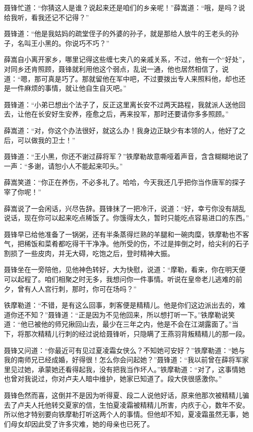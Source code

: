 \documentclass[12pt,oneside]{book}
\begin{document}
聂锋忙道：``你猜这人是谁？说起来还是咱们的乡亲呢！''薛嵩道：``哦，是吗？说给我听，看我还记不记得？''

聂锋道：``他是我姑妈的疏堂侄子的外婆的孙子，就是那给人放牛的王老头的孙子，名叫王小黑的。你说巧不巧？''

薛嵩自小离开家乡，哪里记得这些缠七夹八的亲戚关系，不过，他有一个``好处''，对同乡还肯照顾，聂锋就利用他这个弱点，乱说一通，他也居然相信了，说道：``嗯，那可真是巧了。那就留他在军中吧，不过要拨出专人来照料他，却也还是一件麻烦的事情，就让他自生自灭吧。''

聂锋道：``小弟已想出个法子了，反正这里离长安不过两天路程，我就派人送他回去，让他在长安好生安养，痊愈之后，再来投军，那时还要请你多多照顾。''

薛嵩道：``对，你这个办法很好，就这么办！我身边正缺少有本领的人，他好了之后，可以做我的卫士！''

聂锋道：``王小黑，你还不谢过薛将军？''铁摩勒故意嘶哑着声音，含含糊糊地说了一声：``多谢，请恕小人不能起来叩头。''

薛嵩笑道：``你正在养伤，不必多礼了。哈哈，今天我还几乎把你当作唐军的探子宰了你呢！''

薛嵩说了一会闲话，兴尽告辞。聂锋抹了一把冷汗，说道：``好，幸亏你没有胡乱说话，现在你可以起来吃点稀饭了。你饿得太久，暂时只能吃点容易进口的东西。''

聂锋早已给他准备了一锅粥，还有半条蒸得烂熟的羊腿和一碗肉糜，铁摩勒也不客气，把稀饭和菜肴都吃得干干净净。他所受的伤，不过是摔倒之时，给尖利的石子割损了一些皮肉，并无大碍，吃饱之后，登时精神大振。

聂锋坐在一旁陪他，见他神色转好，大为快慰，说道：``摩勒，看来，你在明天便可以起程了。咱们相聚之时无多，我想问你一件事情。听说在皇帝老儿逃难的前夕，曾有人人宫行刺，那时，你可在场吗？''

铁摩勒道：``不错，是有这么回事，刺客便是精精儿。他是你们这边派出去的，难道你还不知？''聂锋道：``正是因为不见他回来，所以想打听一下。''铁摩勒说笑道：``他已被他的师兄揪回山去，最少在三年之内，他是不会在江湖露面了。''当下，将那次精精儿行刺的经过说给聂锋听，只隐瞒了王燕羽背叛精精儿的那一段。

聂锋又问道：``你最近可有见过夏凌霜女侠么？不知她可安好？''铁摩勒道：``她与我的南师兄已经成婚，好得很！怎么你会问起她？''聂锋道：``我以前曾在薛将军家里见过她，承蒙她还看得起我，没有把我当作坏人。''铁摩勒道：``对了，这事情她也曾对我说过，你对卢夫人暗中维护，她家已知道了。段大侠很感激你。''

聂锋色然而喜，这倒并不是因为听得夏、段二人说他好话，原来他那次被精精儿骗去了卢夫人托他转交夏家的信，生怕夏凌霜被精精儿所害，内疚于心，数年不安。所以他才特别要向铁摩勒打听这两个人的事情。但他却不知，夏凌霜虽然无事，她们母女却因此受了许多灾难，她的母亲也已死了。
\end{document}
